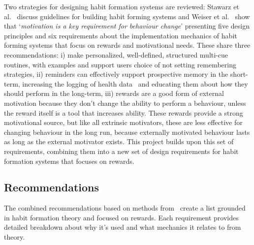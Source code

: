 Two strategies for designing habit formation systems are reviewed: Stawarz et al.~\cite{article_beyond_self_tracking_designing_apps} discuss guidelines for building habit forming systems and Weiser et al.~\cite{article_taxonomy_motivational_affordances_meaningful} show that `\textit{motivation is a key requirement for behaviour change}' presenting five design principles and six requirements about the implementation mechanics of habit forming systems that focus on rewards and motivational needs. These share three recommendations: i) make personalized, well-defined, structured multi-cue routines, with examples and support users choice of not setting remembering strategies, ii) reminders can effectively support prospective memory in the short-term, increasing the logging of health data~\cite{the_power_of_logging_mobile_notifications} and educating them about how they should perform in the long-term, iii) rewards are a good form of external motivation because they don't change the ability to perform a behaviour, unless the reward itself is a tool that increases ability. These rewards provide a strong motivational source, but like all extrinsic motivators, these are less effective for changing behaviour in the long run, because externally motivated behaviour lasts as long as the external motivator exists. This project builds upon this set of requirements, combining them into a new set of design requirements for habit formation systems that focuses on rewards.

\subsection{Recommendations} \label{recommendations}
The combined recommendations based on methods from~\cite{thesis_kathy, article_taxonomy_motivational_affordances_meaningful} create a list grounded in habit formation theory and focused on rewards. Each requirement provides detailed breakdown about why it's used and what mechanics it relates to from theory.

